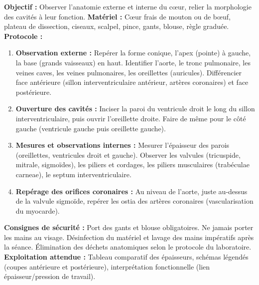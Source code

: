 \documentclass[11pt]{article}
\begin{document}
\begin{experience}
\textbf{Objectif :} Observer l'anatomie externe et interne du cœur, relier la morphologie des cavités à leur fonction.
\textbf{Matériel :} Cœur frais de mouton ou de bœuf, plateau de dissection, ciseaux, scalpel, pince, gants, blouse, règle graduée.
\textbf{Protocole :}
\begin{enumerate}
\item \textbf{Observation externe :} Repérer la forme conique, l'apex (pointe) à gauche, la base (grands vaisseaux) en haut. Identifier l'aorte, le tronc pulmonaire, les veines caves, les veines pulmonaires, les oreillettes (auricules). Différencier face antérieure (sillon interventriculaire antérieur, artères coronaires) et face postérieure.
\item \textbf{Ouverture des cavités :} Inciser la paroi du ventricule droit le long du sillon interventriculaire, puis ouvrir l'oreillette droite. Faire de même pour le côté gauche (ventricule gauche puis oreillette gauche).
\item \textbf{Mesures et observations internes :} Mesurer l'épaisseur des parois (oreillettes, ventricules droit et gauche). Observer les valvules (tricuspide, mitrale, sigmoïdes), les piliers et cordages, les piliers musculaires (trabéculae carneae), le septum interventriculaire.
\item \textbf{Repérage des orifices coronaires :} Au niveau de l'aorte, juste au-dessus de la valvule sigmoïde, repérer les ostia des artères coronaires (vascularisation du myocarde).
\end{enumerate}
\textbf{Consignes de sécurité :} Port des gants et blouse obligatoires. Ne jamais porter les mains au visage. Désinfection du matériel et lavage des mains impératifs après la séance. Élimination des déchets anatomiques selon le protocole du laboratoire.
\textbf{Exploitation attendue :} Tableau comparatif des épaisseurs, schémas légendés (coupes antérieure et postérieure), interprétation fonctionnelle (lien épaisseur/pression de travail).
\end{experience}
\end{document}
